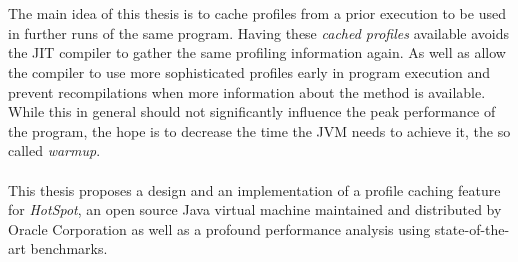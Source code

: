 \\\\
The main idea of this thesis is to cache profiles from a prior execution to be used in further runs of the same program. 
Having these \textit{cached profiles} available avoids the JIT compiler to gather the same profiling information again. As well as allow the compiler to use more sophisticated profiles early in program execution and prevent recompilations when more information about the method is available. While this in general should not significantly influence the peak performance of the program, the hope is to decrease the time the JVM needs to achieve it, the so called \textit{warmup}.
\\\\
This thesis proposes a design and an implementation of a profile caching feature for \textit{HotSpot}, an open source Java virtual machine maintained and distributed by Oracle Corporation as well as a profound performance analysis using state-of-the-art benchmarks.
